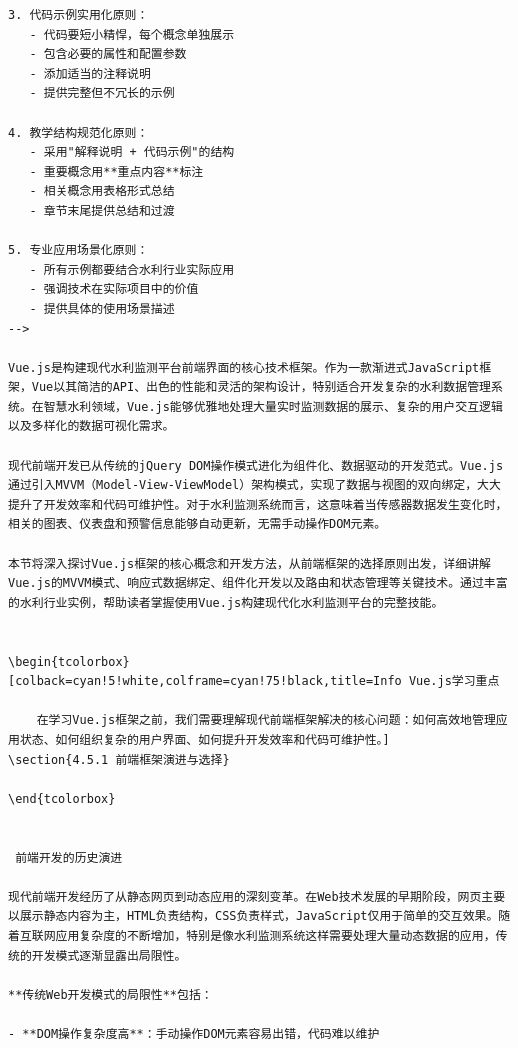 {{\begin{lstlisting}
3. 代码示例实用化原则：
   - 代码要短小精悍，每个概念单独展示
   - 包含必要的属性和配置参数
   - 添加适当的注释说明
   - 提供完整但不冗长的示例

4. 教学结构规范化原则：
   - 采用"解释说明 + 代码示例"的结构
   - 重要概念用**重点内容**标注
   - 相关概念用表格形式总结
   - 章节末尾提供总结和过渡

5. 专业应用场景化原则：
   - 所有示例都要结合水利行业实际应用
   - 强调技术在实际项目中的价值
   - 提供具体的使用场景描述
-->

Vue.js是构建现代水利监测平台前端界面的核心技术框架。作为一款渐进式JavaScript框架，Vue以其简洁的API、出色的性能和灵活的架构设计，特别适合开发复杂的水利数据管理系统。在智慧水利领域，Vue.js能够优雅地处理大量实时监测数据的展示、复杂的用户交互逻辑以及多样化的数据可视化需求。

现代前端开发已从传统的jQuery DOM操作模式进化为组件化、数据驱动的开发范式。Vue.js通过引入MVVM（Model-View-ViewModel）架构模式，实现了数据与视图的双向绑定，大大提升了开发效率和代码可维护性。对于水利监测系统而言，这意味着当传感器数据发生变化时，相关的图表、仪表盘和预警信息能够自动更新，无需手动操作DOM元素。

本节将深入探讨Vue.js框架的核心概念和开发方法，从前端框架的选择原则出发，详细讲解Vue.js的MVVM模式、响应式数据绑定、组件化开发以及路由和状态管理等关键技术。通过丰富的水利行业实例，帮助读者掌握使用Vue.js构建现代化水利监测平台的完整技能。


\begin{tcolorbox}[colback=cyan!5!white,colframe=cyan!75!black,title=Info Vue.js学习重点
    
    在学习Vue.js框架之前，我们需要理解现代前端框架解决的核心问题：如何高效地管理应用状态、如何组织复杂的用户界面、如何提升开发效率和代码可维护性。]
\section{4.5.1 前端框架演进与选择}

\end{tcolorbox}


 前端开发的历史演进

现代前端开发经历了从静态网页到动态应用的深刻变革。在Web技术发展的早期阶段，网页主要以展示静态内容为主，HTML负责结构，CSS负责样式，JavaScript仅用于简单的交互效果。随着互联网应用复杂度的不断增加，特别是像水利监测系统这样需要处理大量动态数据的应用，传统的开发模式逐渐显露出局限性。

**传统Web开发模式的局限性**包括：

- **DOM操作复杂度高**：手动操作DOM元素容易出错，代码难以维护


\end{lstlisting}}}
